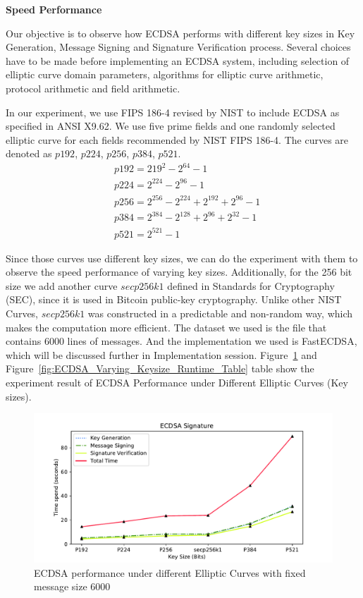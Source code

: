 \documentclass[10pt,sigconf]{acmart}
\begin{document}
\noindent \textbf{Speed Performance}

Our objective is to observe how ECDSA performs with different key sizes in Key Generation, Message Signing and Signature Verification process. Several choices have to be made before implementing an ECDSA system, including selection of elliptic curve domain parameters, algorithms for elliptic curve arithmetic, protocol arithmetic and field arithmetic. 

In our experiment, we use FIPS 186-4 \cite{Kerry13fipspub} revised by NIST to include ECDSA as specified in ANSI X9.62. We use five prime fields and one randomly selected elliptic curve for each fields recommended by NIST FIPS 186-4. The curves are denoted as $p192$, $p224$, $p256$, $p384$, $p521$. 
\begin{align*}
    & p192 = 219^{2} - 2^{64} - 1 \\
    & p224 = 2^{224} - 2^{96} - 1 \\
    & p256 = 2^{256} - 2^{224} + 2^{192} + 2^{96} - 1 \\
    & p384 = 2^{384} - 2^{128} + 2^{96} + 2^{32} - 1 \\
    & p521 = 2^{521} - 1
\end{align*}

Since those curves use different key sizes, we can do the experiment with them to observe the speed performance of varying key sizes. Additionally, for the 256 bit size we add another curve $secp256k1$ defined in Standards for Cryptography (SEC), since it is used in Bitcoin public-key cryptography. Unlike other NIST Curves, $secp256k1$ was constructed in a predictable and non-random way, which makes the computation more efficient. The dataset we used is the file that contains 6000 lines of messages. And the implementation we used is FastECDSA, which will be discussed further in Implementation session. Figure~\ref{fig:ECDSA_Varying_Keysize_Runtime_Graph} and Figure~\ref{fig:ECDSA_Varying_Keysize_Runtime_Table} table show the experiment result of ECDSA Performance under Different Elliptic Curves (Key sizes).

\begin{figure}
\centering
\includegraphics[scale=0.45]{ECDSA_Varying_Keysize_Runtime_Graph}
\caption{\small{ECDSA performance under different Elliptic Curves with fixed message size 6000}}
\label{fig:ECDSA_Varying_Keysize_Runtime_Graph}
\end{figure}
\end{document}
